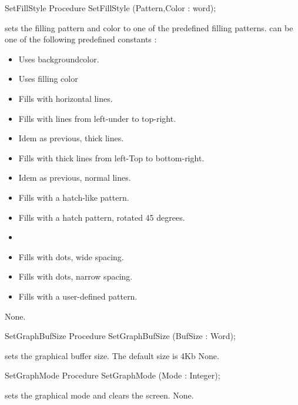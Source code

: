 \begin{procedure}{SetFillStyle}
\Declaration
Procedure SetFillStyle (Pattern,Color : word);

\Description
{} sets the filling pattern and color to one of the
predefined filling patterns.  can be one of the following predefined
constants :
\begin{itemize}
\item {} Uses backgroundcolor.
\item {} Uses filling color
\item {} Fills with horizontal lines.
\item {} Fills with lines from left-under to top-right.
\item {} Idem as previous, thick lines.
\item {} Fills with thick lines from left-Top to bottom-right.
\item {} Idem as previous, normal lines.
\item {}  Fills with a hatch-like pattern.
\item {} Fills with a hatch pattern, rotated 45 degrees.
\item {} 
\item {} Fills with dots, wide spacing.
\item {} Fills with dots, narrow spacing.
\item {} Fills with a user-defined pattern.
\end{itemize}

\Errors
None.
\SeeAlso
{}
\end{procedure}
\begin{procedure}{SetGraphBufSize}
\Declaration
Procedure SetGraphBufSize (BufSize : Word);

\Description
{} 
sets the graphical buffer size. The default size is 4Kb
\Errors
None.
\SeeAlso

\end{procedure}
\begin{procedure}{SetGraphMode}
\Declaration
Procedure SetGraphMode (Mode : Integer);

\Description
{} sets the
graphical mode and clears the screen.
\Errors
None.
\SeeAlso
{}
\end{procedure}
